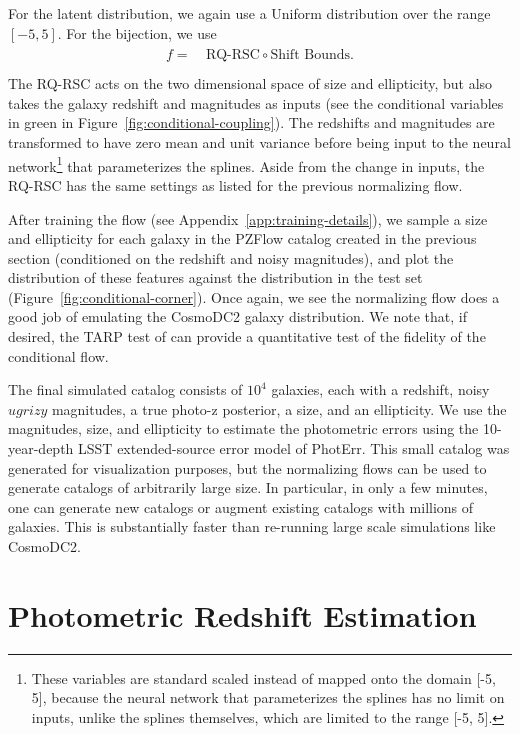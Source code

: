 \documentclass[twocolumn,twocolappendix]{aastex631}
\begin{document}
For the latent distribution, we again use a Uniform distribution over the range $[-5, 5]$.
For the bijection, we use
\begin{align}
    \begin{split}
        f =& ~ \text{RQ-RSC} \circ \text{Shift Bounds}. \\
    \end{split}
\end{align}
The RQ-RSC acts on the two dimensional space of size and ellipticity, but also takes the galaxy redshift and magnitudes as inputs (see the conditional variables in green in Figure~\ref{fig:conditional-coupling}).
The redshifts and magnitudes are transformed to have zero mean and unit variance before being input to the neural network\footnote{These variables are standard scaled instead of mapped onto the domain [-5, 5], because the neural network that parameterizes the splines has no limit on inputs, unlike the splines themselves, which are limited to the range [-5, 5].} that parameterizes the splines.
Aside from the change in inputs, the RQ-RSC has the same settings as listed for the previous normalizing flow.

After training the flow (see Appendix~\ref{app:training-details}), we sample a size and ellipticity for each galaxy in the PZFlow catalog created in the previous section (conditioned on the redshift and noisy magnitudes), and plot the distribution of these features against the distribution in the test set (Figure~\ref{fig:conditional-corner}).
Once again, we see the normalizing flow does a good job of emulating the CosmoDC2 galaxy distribution.
We note that, if desired, the TARP test of \citet{lemos2023} can provide a quantitative test of the fidelity of the conditional flow. 

The final simulated catalog consists of $10^4$ galaxies, each with a redshift, noisy $ugrizy$ magnitudes, a true photo-z posterior, a size, and an ellipticity.
We use the magnitudes, size, and ellipticity to estimate the photometric errors using the 10-year-depth LSST extended-source error model of PhotErr.
This small catalog was generated for visualization purposes, but the normalizing flows can be used to generate catalogs of arbitrarily large size.
In particular, in only a few minutes, one can generate new catalogs or augment existing catalogs with millions of galaxies.
This is substantially faster than re-running large scale simulations like CosmoDC2.


\section{Photometric Redshift Estimation}
\label{sec:photo-z}
\end{document}
